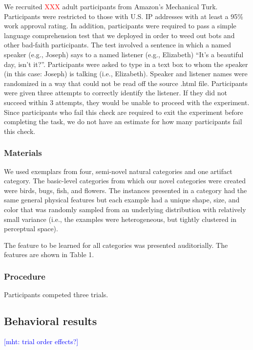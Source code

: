 \documentclass[10pt,letterpaper]{article}
\newcommand{\red}[1]{\textcolor{Red}{#1}}
\newcommand{\mht}[1]{\textcolor{Blue}{[mht: #1]}}
\begin{document}
We recruited \red{XXX} adult participants from Amazon's Mechanical Turk. 
Participants were restricted to those with U.S. IP addresses with at least a 95\% work approval rating. 
In addition, participants were required to pass a simple language comprehension test that we deployed in order to weed out bots and other bad-faith participants. 
The test involved a sentence in which a named speaker (e.g., Joseph) says to a named listener (e.g., Elizabeth) ``It's a beautiful day, isn't it?''. 
Participants were asked to type in a text box to whom the speaker (in this case: Joseph) is talking (i.e., Elizabeth).
Speaker and listener names were randomized in a way that could not be read off the source .html file.
Participants were given three attempts to correctly identify the listener. 
If they did not succeed within 3 attempts, they would be unable to proceed with the experiment.
Since participants who fail this check are required to exit the experiment before completing the task, we do not have an estimate for how many participants fail this check. 

\subsubsection{Materials}

We used exemplars from four, semi-novel natural categories and one artifact category.
The basic-level categories from which our novel categories were created were birds, bugs, fish, and flowers. 
The instances presented in a category had the same general physical features but each example had a unique shape, size, and color that was randomly sampled from an underlying distribution with relatively small variance (i.e., the examples were heterogeneous, but tightly clustered in perceptual space).

The feature to be learned for all categories was presented auditorially. 
The features are shown in Table 1. 

\subsubsection{Procedure}

Participants competed three trials. 

\subsection{Behavioral results}

\mht{trial order effects?}
\end{document}
